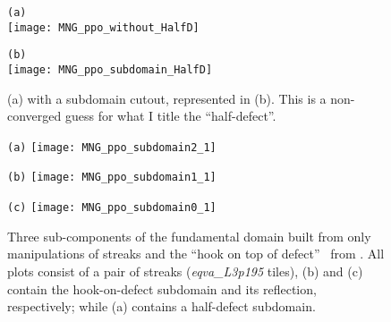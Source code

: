 \begin{description}
\begin{figure}
\begin{minipage}[height=.48\textheight]{.48\textwidth}
\centering \small{\texttt{(a)}}\\
\texttt{[image: MNG\_ppo\_without\_HalfD]}
\end{minipage}
\begin{minipage}[height=.48\textheight]{.48\textwidth}
\centering \small{\texttt{(b)}}\\
\texttt{[image: MNG\_ppo\_subdomain\_HalfD]}
\end{minipage}
\caption{ \label{fig:MNG_halfdefect}
(a)  %
with a subdomain cutout, represented in (b). This
is a non-converged guess for what I title the ``half-defect''.
}
\end{figure}

\begin{figure}
\begin{minipage}[height=.20\textheight]{.9\textwidth}
\centering \small{\texttt{(a)}}
\texttt{[image: MNG\_ppo\_subdomain2\_1]}
\end{minipage}
\begin{minipage}[height=.20\textheight]{.9\textwidth}
\centering \small{\texttt{(b)}}
\texttt{[image: MNG\_ppo\_subdomain1\_1]}
\end{minipage}
\begin{minipage}[height=.20\textheight]{.9\textwidth}
\centering \small{\texttt{(c)}}
\texttt{[image: MNG\_ppo\_subdomain0\_1]}
\end{minipage}
\caption{ \label{fig:MNG_pposubdomains_one}
Three sub-components of the fundamental domain built from only manipulations of streaks
and the ``hook on top of defect'' \twot\ from . All plots consist
of a pair of streaks (\emph{eqva\_L3p195} tiles), (b) and (c) contain the hook-on-defect
subdomain and its reflection, respectively; while (a) contains a half-defect subdomain.
}
\end{figure}



\end{description}
